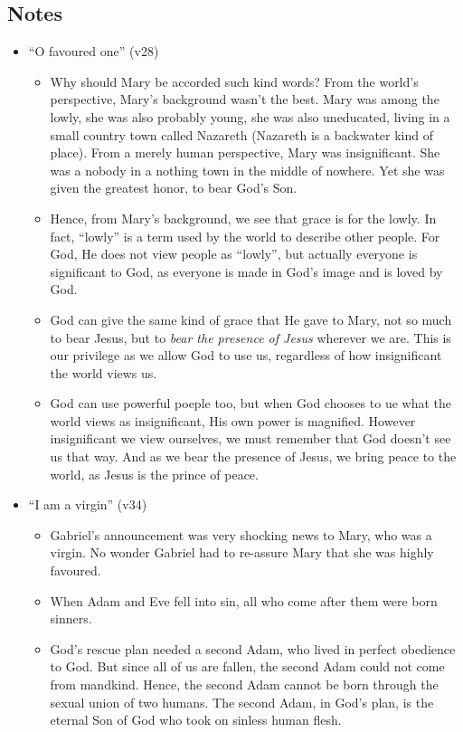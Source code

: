 \subsection*{Notes}
\begin{itemize}
  \item{``O favoured one'' (v28)
  \begin{itemize}
    \item{Why should Mary be accorded such kind words?  From the world's
    perspective, Mary's background wasn't the best.  Mary was among the
    lowly, she was also probably young, she was also uneducated, living in a
    small country town called Nazareth (Nazareth is a backwater kind of
    place).  From a merely human perspective, Mary was insignificant.  She
    was a nobody in a nothing town in the middle of nowhere.  Yet she was
    given the greatest honor, to bear God's Son.}
    \item{Hence, from Mary's background, we see that grace is for the lowly. In fact, ``lowly'' is a term used by the world to describe other people. For God, He does not view people as ``lowly'', but actually everyone is significant to God, as everyone is made in God's image and is loved by God.}
    \item{God can give the same kind of grace that He gave to Mary, not so much to bear Jesus, but to \textit{bear the presence of Jesus} wherever we are. This is our privilege as we allow God to use us, regardless of how insignificant the world views us. }
    \item{God can use powerful poeple too, but when God chooses to ue what the world views as insignificant, His own power is magnified. However insignificant we view ourselves, we must remember that God doesn't see us that way. And as we bear the presence of Jesus, we bring peace to the world, as Jesus is the prince of peace.}
  \end{itemize}}
  \item{``I am a virgin'' (v34)
  \begin{itemize}
    \item{Gabriel's announcement was very shocking news to Mary, who was a virgin. No wonder Gabriel had to re-assure Mary that she was highly favoured. }
    \item{When Adam and Eve fell into sin, all who come after them were born sinners.}
    \item{God's rescue plan needed a second Adam, who lived in perfect obedience to God. But since all of us are fallen, the second Adam could not come from mandkind. Hence, the second Adam cannot be born through the sexual union of two humans. The second Adam, in God's plan, is the eternal Son of God who took on sinless human flesh.}

\end{itemize}}
\end{itemize}
